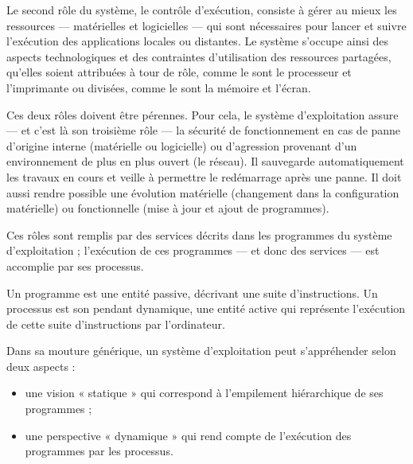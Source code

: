 Le second rôle du système, le contrôle d’exécution, consiste à gérer au mieux les ressources --- matérielles et logicielles --- qui sont nécessaires pour lancer et suivre l’exécution des applications locales ou distantes. Le système s’occupe ainsi des aspects technologiques et des contraintes d’utilisation des ressources partagées, qu’elles soient attribuées à tour de rôle, comme le sont le processeur et l’imprimante ou divisées, comme le sont la mémoire et l’écran.

Ces deux rôles doivent être pérennes. Pour cela, le système d’exploitation assure --- et c’est là son troisième rôle --- la sécurité de fonctionnement en cas de panne d’origine interne (matérielle ou logicielle) ou d’agression provenant d’un environnement de plus en plus ouvert (le réseau). Il sauvegarde automatiquement les travaux en cours et veille à permettre le redémarrage après une panne. Il doit aussi rendre possible une évolution matérielle (changement dans la configuration matérielle) ou fonctionnelle (mise à jour et ajout de programmes).

Ces rôles sont remplis par des services décrits dans les programmes du système d’exploitation ; l’exécution de ces programmes --- et donc des services --- est accomplie par ses processus.

Un programme est une entité passive, décrivant une suite d’instructions. Un processus est son pendant dynamique, une entité active qui représente l’exécution de cette suite d’instructions par l’ordinateur.


Dans sa mouture générique, un système d’exploitation peut s'appréhender selon deux aspects :
\begin{itemize}
\item une vision « statique » qui correspond à l’empilement hiérarchique de ses programmes ;
\item une perspective « dynamique » qui rend compte de l’exécution des programmes par les processus.
\end{itemize}

